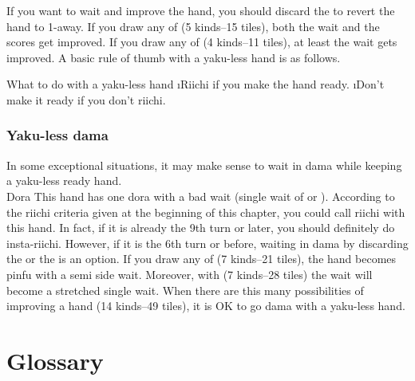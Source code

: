 \bigskip
If you want to wait and improve the hand, you should discard the {\large{}} to revert the hand to 1-away. If you draw any of {\large{}} (5 kinds--15 tiles), both the wait and the scores get improved. If you draw any of {\large{}} (4 kinds--11 tiles), at least the wait gets improved. 
A basic rule of thumb with a {\jap yaku}-less hand is as follows.

\bigskip

\begin{itembox}[c]{What to do with a {\jap yaku}-less hand}
\bi
\i {\jap Riichi} if you make the hand ready.
\i Don't make it ready if you don't {\jap riichi}.
\vsps
\ei
\end{itembox}

\subsubsection*{{\jap Yaku}-less {\jap dama}}
In some exceptional situations, it may make sense to wait in {\jap dama} while keeping a {\jap yaku}-less ready hand. 
\bp
{}~~\\
\hspace{315pt}\footnotesize{\jap Dora}
\ep
This hand has one {\jap dora} with a bad wait (single wait of {\large {}} or {\large {}}). According to the {\jap riichi} criteria given at the beginning of this chapter, you could call {\jap riichi} with this hand. In fact, if it is already the 9th turn or later, you should definitely do insta-{\jap riichi}. However, if it is the 6th turn or before, waiting in {\jap dama} by discarding the {\large {}} or the {\large{}} is an option. 
If you draw any of {\large{}} (7 kinds--21 tiles), the hand becomes {\jap pinfu} with a semi side wait. Moreover, with {\large{}} (7 kinds--28 tiles) the wait will become a stretched single wait. When there are this many possibilities of improving a hand (14 kinds--49 tiles), it is OK to go {\jap dama} with a {\jap yaku}-less hand.

\newpage
\section{Glossary}

